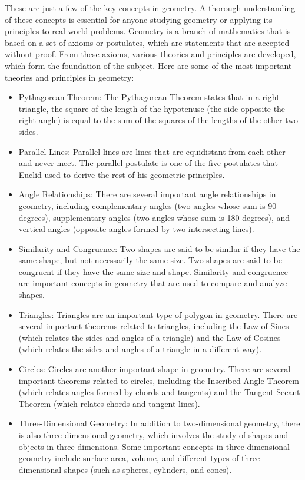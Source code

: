 \noindent These are just a few of the key concepts in geometry. A thorough understanding of these concepts is essential for anyone studying geometry or applying its principles to real-world problems. Geometry is a branch of mathematics that is based on a set of axioms or postulates, which are statements that are accepted without proof. From these axioms, various theories and principles are developed, which form the foundation of the subject. Here are some of the most important theories and principles in geometry:

\begin{itemize}
     
\item Pythagorean Theorem: The Pythagorean Theorem states that in a right triangle, the square of the length of the hypotenuse (the side opposite the right angle) is equal to the sum of the squares of the lengths of the other two sides.

\item Parallel Lines: Parallel lines are lines that are equidistant from each other and never meet. The parallel postulate is one of the five postulates that Euclid used to derive the rest of his geometric principles.

\item Angle Relationships: There are several important angle relationships in geometry, including complementary angles (two angles whose sum is 90 degrees), supplementary angles (two angles whose sum is 180 degrees), and vertical angles (opposite angles formed by two intersecting lines).

\item Similarity and Congruence: Two shapes are said to be similar if they have the same shape, but not necessarily the same size. Two shapes are said to be congruent if they have the same size and shape. Similarity and congruence are important concepts in geometry that are used to compare and analyze shapes.

\item Triangles: Triangles are an important type of polygon in geometry. There are several important theorems related to triangles, including the Law of Sines (which relates the sides and angles of a triangle) and the Law of Cosines (which relates the sides and angles of a triangle in a different way).

\item Circles: Circles are another important shape in geometry. There are several important theorems related to circles, including the Inscribed Angle Theorem (which relates angles formed by chords and tangents) and the Tangent-Secant Theorem (which relates chords and tangent lines).

\item Three-Dimensional Geometry: In addition to two-dimensional geometry, there is also three-dimensional geometry, which involves the study of shapes and objects in three dimensions. Some important concepts in three-dimensional geometry include surface area, volume, and different types of three-dimensional shapes (such as spheres, cylinders, and cones).
\end{itemize}

